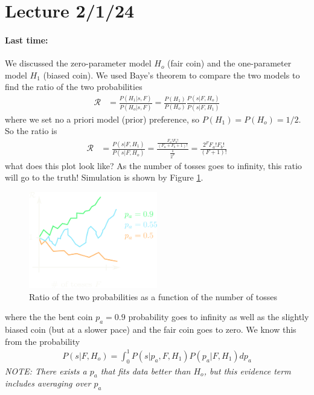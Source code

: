 \documentclass[../main.tex]{subfiles}
\begin{document}
\pagebreak 
\section*{Lecture 2/1/24}
\barh \vspace{10px}

\paragraph{Last time:} We discussed the zero-parameter model $H_o$ (fair coin) and the one-parameter
model $H_1$ (biased coin). We used Baye's theorem to compare the two models to find the ratio
of the two probabilities
\begin{align*}
    \mathcal{R} &= \frac{P(H_1 | s,F)}{P(H_o | s,F)} 
        = \frac{P(H_1)}{P(H_o)} \frac{P(s|F,H_o)}{P(s|F,H_1)}
\end{align*}
where we set no a priori model (prior) preference, so $P(H_1) = P(H_o) = 1/2$. So the ratio is
\begin{align*}
    \mathcal{R} &= \frac{P(s|F,H_1)}{P(s|F,H_o)}
        = \frac{\frac{F_a! F_b!}{(F_a + F_b + 1)!}}{\frac{1}{2^F}}
        = \frac{2^F F_a! F_b!}{(F + 1)!}
\end{align*}
what does this plot look like? As the number of tosses goes to infinity, this ratio will go to the
truth! Simulation is shown by Figure \ref{fig:bentcoin}.
\begin{figure}[ht]
    \centering
    \includegraphics[width=0.5\textwidth]{images/bentcoin.png}
    \caption{Ratio of the two probabilities as a function of the number of tosses}
    \label{fig:bentcoin}
\end{figure}
where the the bent coin $p_a = 0.9$ probability goes to infinity as well as the slightly biased coin
(but at a slower pace) and the fair coin goes to zero. We know this from the probability
\begin{align*}
    P(s|F,H_o) = \int_0^1 P(s|p_a, F, H_1) P(p_a|F, H_1) dp_a
\end{align*} 
\emph{NOTE: There exists a $p_a$ that fits data better than $H_o$, but this evidence term includes
averaging over $p_a$}
\end{document}

